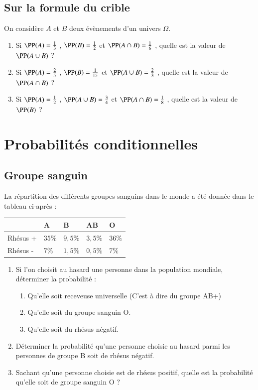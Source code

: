 \documentclass[oneside,12pt]{article}          %
\begin{document}
\subsection{Sur la formule du crible}
On considère $A$ et $B$ deux évènements d'un univers $\Omega$.
\begin{enumerate} \setlength{\itemsep}{1mm}
	\item Si $\PP(A)=\frac{1}{3}$ , $\PP(B)=\frac{1}{2}$ et $\PP(A \cap B)=\frac{1}{6}$ , quelle est la valeur de $\PP(A \cup B)$ ?
	\item Si $\PP(A)=\frac{2}{5}$ , $\PP(B)=\frac{1}{15}$ et $\PP(A \cup B)=\frac{2}{3}$ , quelle est la valeur de $\PP(A \cap B)$ ?
	\item Si $\PP(A)=\frac{1}{2}$ , $\PP(A \cup B)=\frac{3}{4}$ et $\PP(A \cap B)=\frac{1}{8}$ , quelle est la valeur de $\PP(B)$ ?
\end{enumerate}



\section{Probabilités conditionnelles}

\subsection{Groupe sanguin}
La répartition des différents groupes sanguins dans le monde a été donnée dans le tableau ci-après :
\begin{center}
	\renewcommand{\arraystretch}{1.5}
	\begin{tabular}{| P{4cm} | P{3cm} | P{3cm} | P{3cm} | P{3cm} |} \hline
	  & A & B & AB & O \\ \hline
	Rhésus + & $35\%$ & $9,5\%$ & $3,5\%$ & $36\%$ \\ \hline
	Rhésus - & $7\%$ & $1,5\%$ & $0,5\%$ & $7\%$ \\ \hline
	\end{tabular}
\end{center}

\begin{enumerate}
	\item Si l'on choisit au hasard une personne dans la population mondiale, déterminer la probabilité :
	\begin{enumerate}
		\item Qu'elle soit receveuse universelle (C'est à dire du groupe AB+)
		\item Qu'elle soit du groupe sanguin O.
		\item Qu'elle soit du rhésus négatif.
	\end{enumerate}
	\item Déterminer la probabilité qu'une personne choisie au hasard parmi les personnes de groupe B soit de rhésus négatif.
	\item Sachant qu'une personne choisie est de rhésus positif, quelle est la probabilité qu'elle soit de groupe sanguin O ?
\end{enumerate}
\end{document}
